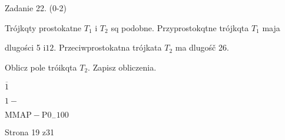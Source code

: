 \documentclass[a4paper,12pt]{article}
\begin{document}
Zadanie 22. (0-2)

Trójkqty prostokatne $T_{1}$ i $T_{2}$ sq podobne. Przyprostokqtne trójkqta $T_{1}$ maja

dlugości 5 $\mathrm{i} 12$. Przeciwprostokatna trójkata $T_{2}$ ma dlugośč 26.

Oblicz pole tróikqta $T_{2}$. Zapisz obliczenia.

$\overline{1}$

$1-$

$\mathrm{M}\mathrm{M}\mathrm{A}\mathrm{P}-\mathrm{P}0_{-}100$

Strona 19 z31
\end{document}

